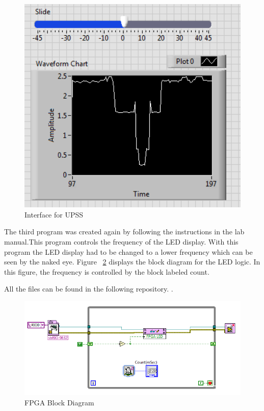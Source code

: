 \documentclass{scrartcl}
\begin{document}
\begin{figure}[H]
  \centering
    \includegraphics[width=1\textwidth]{graph2.png}
    \caption{Interface for UPSS}
    \label{fig:third}
\end{figure}

The third program was created again by following the instructions in the lab manual.This program controls the frequency of the LED display. With this program the LED display had to be changed to a lower frequency which can be seen by the naked eye. Figure ~\ref{fig:fourth} displays the block diagram for the LED logic. In this figure, the frequency is controlled by the block labeled count.


All the files can be found in the following repository. \citep{github}. 
\begin{figure}[H]
  \centering
    \includegraphics[width=1\textwidth]{fpga.png}
    \caption{FPGA Block Diagram}
    \label{fig:fourth}
\end{figure}



\listoffigures


\end{document}
